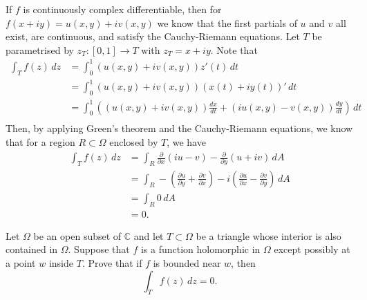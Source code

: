 \documentclass[12 pt, letterpaper]{hmcpset}
\begin{document}
\begin{solution}
	If $f$ is continuously complex differentiable, then for $f(x + i y) = u(x, y) + iv(x, y)$ we know that the first partials of $u$ and $v$ all exist, are continuous, and satisfy the Cauchy-Riemann equations. Let $T$ be parametrised by $z_{T} : [0, 1] \to T$ with $z_{T} = x + i y$. Note that
	\[
		\begin{split}
			\int_{T} f(z) \, dz & = \int_{0}^{1} (u(x, y) + i v(x, y)) z'(t) \, dt \\
					    & = \int_{0}^{1} (u(x, y) + i v(x, y))(x(t) + i y(t))' \, dt \\
					    & = \int_{0}^{1} \left ( (u(x, y) + i v(x, y)) \frac{dx}{dt} + (i u(x, y) - v(x, y)) \frac{dy}{dt} \right ) \, dt \\
		\end{split}
	\]
	Then, by applying Green's theorem and the Cauchy-Riemann equations, we know that for a region $R \subset \Omega$ enclosed by $T$, we have
	\[
		\begin{split}
			\int_{T} f(z) \, dz & = \int_{R} \frac{\partial }{\partial x}(i u - v) - \frac{\partial }{\partial y}(u + i v) \, dA \\
					    & = \int_{R} - \left ( \frac{\partial u}{\partial y} +  \frac{\partial v}{\partial x} \right ) - i \left ( \frac{\partial u}{\partial x} - \frac{\partial v}{\partial y} \right ) \, dA \\
					    & = \int_{R} 0 \, dA \\
					    & = 0.
		\end{split} 
	\]
\end{solution}

\pagebreak

\begin{problem}[6.]
	Let $\Omega$ be an open subset of $\mathbb{C}$ and let $T \subset \Omega$ be a triangle whose interior is also contained in $\Omega$. Suppose that $f$ is a function holomorphic in $\Omega$ except possibly at a point $w$ inside $T$. Prove that if $f$ is bounded near $w$, then
	\[
		\int_{T} f(z) \, dz = 0.
	\]
\end{problem}
\end{document}
